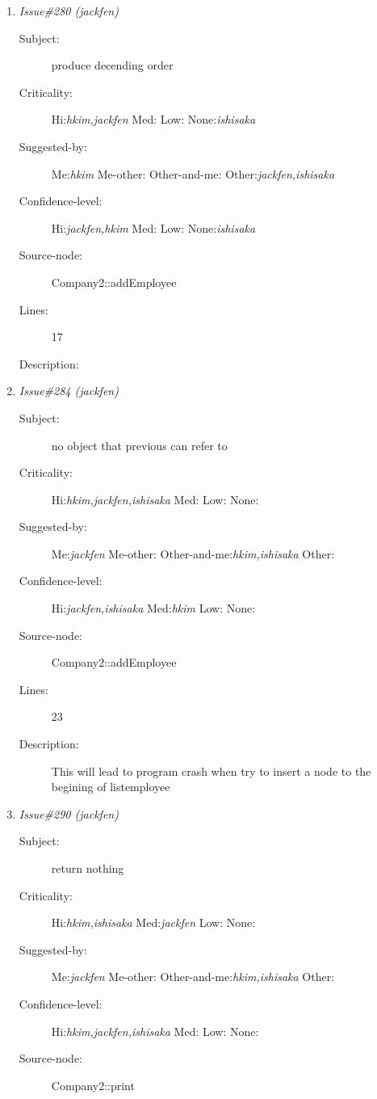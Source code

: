 \begin{enumerate}
\begin{description}
\item [Lines:] 31

\item [Description:] returns before assigning newly created
employeenode to listEmployee--a private variable of Company2
\end{description}
\item {\it Issue\#280 (jackfen)}
\begin{description}
\item [Subject:] produce decending order
\item [Criticality:] Hi:{\it hkim,jackfen} Med:{\it } Low:{\it } None:{\it ishisaka}
\item [Suggested-by:] Me:{\it hkim} Me-other:{\it } Other-and-me:{\it } Other:{\it jackfen,ishisaka}
\item [Confidence-level:] Hi:{\it jackfen,hkim} Med:{\it } Low:{\it } None:{\it ishisaka}
\item [Source-node:] Company2::addEmployee

\item [Lines:] 17

\item [Description:] 
\end{description}
\item {\it Issue\#284 (jackfen)}
\begin{description}
\item [Subject:] no object that previous can refer to
\item [Criticality:] Hi:{\it hkim,jackfen,ishisaka} Med:{\it } Low:{\it } None:{\it }
\item [Suggested-by:] Me:{\it jackfen} Me-other:{\it } Other-and-me:{\it hkim,ishisaka} Other:{\it }
\item [Confidence-level:] Hi:{\it jackfen,ishisaka} Med:{\it hkim} Low:{\it } None:{\it }
\item [Source-node:] Company2::addEmployee

\item [Lines:] 23

\item [Description:] This will lead to program crash when try to
insert a node to the begining of listemployee
\end{description}
\item {\it Issue\#290 (jackfen)}
\begin{description}
\item [Subject:] return nothing
\item [Criticality:] Hi:{\it hkim,ishisaka} Med:{\it jackfen} Low:{\it } None:{\it }
\item [Suggested-by:] Me:{\it jackfen} Me-other:{\it } Other-and-me:{\it hkim,ishisaka} Other:{\it }
\item [Confidence-level:] Hi:{\it hkim,jackfen,ishisaka} Med:{\it } Low:{\it } None:{\it }
\item [Source-node:] Company2::print


\end{description}
\end{enumerate}
